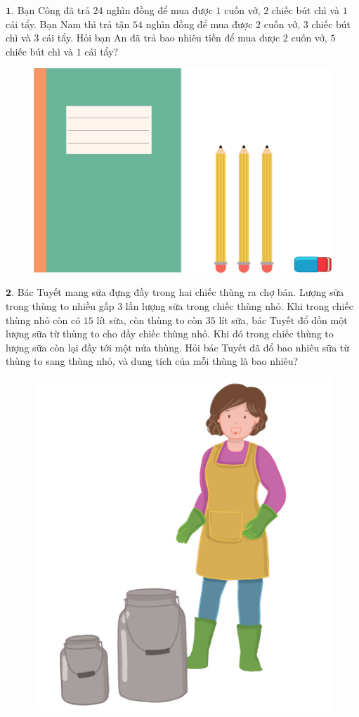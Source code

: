 \begin{multicols}{2}
	$\pmb{1.}$	Bạn Công đã trả $24$ nghìn đồng để mua được $1$ cuốn vở, $2$ chiếc bút chì và $1$ cái tẩy. Bạn Nam thì trả tận $54$ nghìn đồng để mua được $2$ cuốn vở, $3$ chiếc bút chì và $3$ cái tẩy. Hỏi bạn An đã trả bao nhiêu tiền để mua được $2$ cuốn vở, $5$ chiếc bút chì và $1$ cái tẩy?
	\begin{figure}[H]
		\centering
		\vspace*{-5pt}
		\captionsetup{labelformat= empty, justification=centering}
		\includegraphics[width=1\linewidth]{Pi3_bai1}
		\vspace*{-10pt}
	\end{figure}
	$\pmb{2.}$ Bác Tuyết mang sữa đựng đầy trong hai chiếc thùng ra chợ bán. Lượng sữa trong thùng to nhiều gấp $3$ lần lượng sữa trong chiếc thùng nhỏ. Khi trong chiếc thùng nhỏ còn có $15$ lít sữa, còn thùng to còn $35$ lít sữa, bác Tuyết đổ dồn một lượng sữa từ thùng to cho đầy chiếc thùng nhỏ. Khi đó trong chiếc thùng to lượng sữa còn lại  đầy tới một nửa thùng. Hỏi bác Tuyết đã đổ bao nhiêu sữa từ thùng to sang thùng nhỏ, và dung tích của mỗi thùng là bao nhiêu?
	\begin{figure}[H]
		\centering
		\vspace*{-10pt}
		\captionsetup{labelformat= empty, justification=centering}
		\includegraphics[width=0.75\linewidth]{Pi3_bai2}

\end{figure}
\end{multicols}
